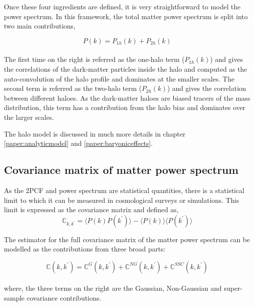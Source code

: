 Once these four ingredients are defined, 
it is very straightforward to model the power spectrum. In this framework, the
total matter power spectrum is split into two main contributions,

\begin{equation}
	P(k) = P_{1h}(k)  + P_{2h}(k)
\end{equation}
\\
The first time on the right is referred as the one-halo term ($P_{1h}(k)$) and gives
the correlations of the dark-matter particles inside the halo and computed as
the auto-convolution of the halo profile and dominates at the smaller scales. 
The second term is referred as the two-halo
term ($P_{2h}(k)$) and gives the correlation between different haloes. As the 
dark-matter haloes are biased tracers of the mass distribution, this term has a 
contribution from the halo bias and dominates over the larger scales. 

The halo model is discussed in much more details in chapter \ref{paper:analyticmodel} 
and \ref{paper:baryoniceffects}.


\subsection{Covariance matrix of matter power spectrum}
As the 2PCF and power spectrum are statistical quantities, there is a statistical limit
to which it can be measured in cosmological surveys or simulations. This limit is expressed
as the covariance matrix and defined as,
\begin{equation}
	\mathbb{C}_{k,k^{\prime}}	= 
			\langle P(k)P(k^{\prime}) \rangle - 
			\langle P(k)\rangle \langle P(k^{\prime})\rangle
\end{equation}

The estimator for the full covariance matrix of the matter power spectrum 
can be modelled as the contributions from three broad parts:

\begin{equation}
	\mathbb{C}(k,k^{\prime}) = \mathbb{C}^{G}(k,k^{\prime}) + 
								\mathbb{C}^{NG}(k,k^{\prime}) + 
								\mathbb{C}^{SSC}(k,k^{\prime})
\end{equation}
\\
where, the three terms on the right are the Gaussian, Non-Gaussian and super-sample covariance contributions. 

